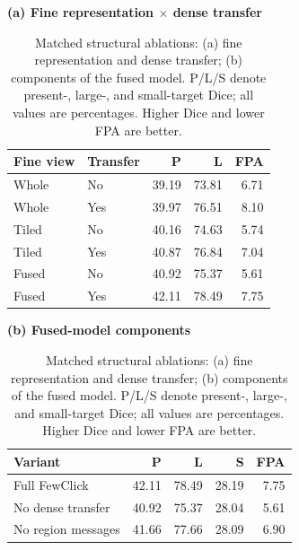 \begin{table}[t]
\centering
\caption{Matched structural ablations: (a) fine representation and dense transfer; (b) components of the fused model. P/L/S denote present-, large-, and small-target Dice; all values are percentages. Higher Dice and lower FPA are better.}
\label{tab:ablation}
\small
\setlength{\tabcolsep}{4pt}
\textbf{(a) Fine representation $\times$ dense transfer}\\[2pt]
\begin{tabular}{@{}llrrr@{}}
\toprule
Fine view & Transfer & P & L & FPA \\
\midrule
Whole & No & 39.19 & 73.81 & 6.71 \\
Whole & Yes & 39.97 & 76.51 & 8.10 \\
Tiled & No & 40.16 & 74.63 & 5.74 \\
Tiled & Yes & 40.87 & 76.84 & 7.04 \\
Fused & No & 40.92 & 75.37 & 5.61 \\
Fused & Yes & 42.11 & 78.49 & 7.75 \\
\bottomrule
\end{tabular}
\par\vspace{4pt}
\textbf{(b) Fused-model components}\\[2pt]
\begin{tabular}{@{}lrrrr@{}}
\toprule
Variant & P & L & S & FPA \\
\midrule
Full FewClick & 42.11 & 78.49 & 28.19 & 7.75 \\
No dense transfer & 40.92 & 75.37 & 28.04 & 5.61 \\
No region messages & 41.66 & 77.66 & 28.09 & 6.90 \\
\bottomrule
\end{tabular}
\end{table}
